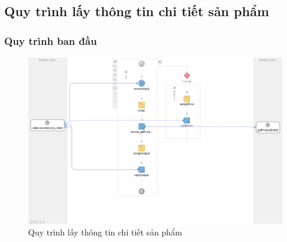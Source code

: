 \newpage

\subsection{Quy trình lấy thông tin chi tiết sản phẩm}
\subsubsection*{Quy trình ban đầu}
\begin{figure}[!htp]
    \centering
    \includegraphics[width=12cm]{img/bpel/productDetail.jpg}
    \newline
    \caption{Quy trình lấy thông tin chi tiết sản phẩm}
\end{figure}

